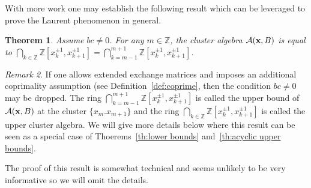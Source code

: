 \documentclass{amsart}
\newtheorem{theorem}{Theorem}[section]
\theoremstyle{definition}
\theoremstyle{remark}
\newtheorem{remark}[theorem]{Remark}
\numberwithin{equation}{section}
\newcommand{\cA}{{\mathcal{A}}}
\newcommand{\bx}{{\bf x}}
\newcommand{\ZZ}{{\mathbb{Z}}}
\begin{document}
  With more work one may establish the following result which can be leveraged to prove the Laurent phenomenon in general.
  \begin{theorem}
    Assume $bc\ne0$.  For any $m\in\ZZ$, the cluster algebra $\cA(\bx,B)$ is equal to $\bigcap_{k\in\ZZ}\ZZ[x_k^{\pm1},x_{k+1}^{\pm1}]=\bigcap_{k=m-1}^{m+1}\ZZ[x_k^{\pm1},x_{k+1}^{\pm1}]$.
  \end{theorem}
  \begin{remark}
    If one allows extended exchange matrices and imposes an additional coprimality assumption (see Definition~\ref{def:coprime}, then the condition $bc\ne0$ may be dropped.  The ring $\bigcap_{k=m-1}^{m+1}\ZZ[x_k^{\pm1},x_{k+1}^{\pm1}]$ is called the upper bound of $\cA(\bx,B)$ at the cluster $\{x_m.x_{m+1}\}$ and the ring $\bigcap_{k\in\ZZ}\ZZ[x_k^{\pm1},x_{k+1}^{\pm1}]$ is called the upper cluster algebra.  We will give more details below where this result can be seen as a special case of Thoerems~\ref{th:lower bounds} and~\ref{th:acyclic upper bounds}.
  \end{remark}
  The proof of this result is somewhat technical and seems unlikely to be very informative so we will omit the details.
\end{document}

